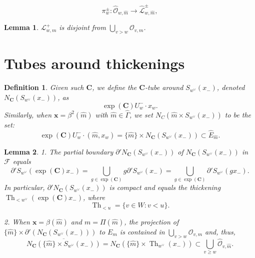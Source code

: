 \documentclass[10pt,a4paper]{amsart}
\newtheorem{lem}{Lemma}
\newtheorem{defi}{Definition}
\def\CC{{\mathbf{C}}}
\DeclareMathOperator{\Th}{Th}
\def\bx{\mathbf{x}}
\def\cF{{\mathscr{F}}}
\def\cL{{\mathscr{L}}}
\def\cO{{\mathscr{O}}}
\def\cW{{\mathscr{W}}}
\def\ol{\overline}
\begin{document}
\begin{equation}\label{eq:pm-proj} 
\pi_{w}^{\pm}: \hat{\cO}_{w, \hat{m}}\to \hat{\cL}^\pm_{w,\hat{m}},
\end{equation}

\begin{lem}\label{lem:disjoint}
$\cL^+_{w,m}$ is disjoint from $\bigcup_{v>w} \cO_{v,m}$. 
\end{lem}

\section{Tubes around thickenings}\label{sec:tubes}

\begin{defi}\label{def:tube}
Given such $\CC$,  
we define the {\em $\CC$-tube} around $S_{w^\vee}(x_-)$, denoted $N_{\CC}(S_{w^\vee}(x_-))$, as
$$
\exp(\CC)U^-_w \cdot x_w. 
$$
Similarly, when $\bx = \beta^2(\hat{m})$ with $\hat{m} \in \hat\Gamma$, we set $N_C(\hat{m} \times S_{w^\vee}(x_-))$ to be the set: 
\begin{equation*}
\exp(\CC) U_w^- \cdot (\hat{m},x_w )= \{ \hat{m} \} \times N_{\CC}(S_{w^\vee}(x_-))  \subset \hat{E}_{\hat{m}}. 
\end{equation*}
\end{defi} 

\begin{lem}\label{lem:compactifications of leaves} 
1. The partial boundary $\partial' N_{\CC}(S_{w^\vee}(x_-))$ of $N_{\CC}(S_{w^\vee}(x_-))$ in $\cF$ equals
$$
\partial' S_{w^\vee}(\exp({\CC})x_-)= \bigcup_{g\in \exp({\CC})} g \partial' S_{w^\vee}(x_-)= \bigcup_{g\in \exp({\CC})}  \partial' S_{w^\vee}(g x_-). 
$$
 In particular, $\partial' N_{\CC}(S_{w^\vee}(x_-))$ is compact and equals the thickening $\Th_{<w^\vee}( \exp({\CC})x_-)$, where 
$$
 \Th_{< u}= \{v\in W: v< u\}. 
$$ 

2. When $\bx = \beta(\hat{m})$ and $m=\Pi(\hat{m})$,
the projection of $\{ \hat{m}\} \times \partial'(N_{\CC}(S_{w^\vee}(x_-)))$ to $E_m$ is contained in $\bigcup_{v>w} \cO_{v,m}$ and, thus,
$$
\ol{N_{\CC}(\{ \hat{m} \} \times S_{w^\vee}(x_-))}= N_{\CC}(\{ \hat{m} \}\times \Th_{w^\vee}(x_-))\subset \bigcup_{v\ge w} \hat{\cO}_{v, \hat{m}}. 
$$
\end{lem}
\end{document}
